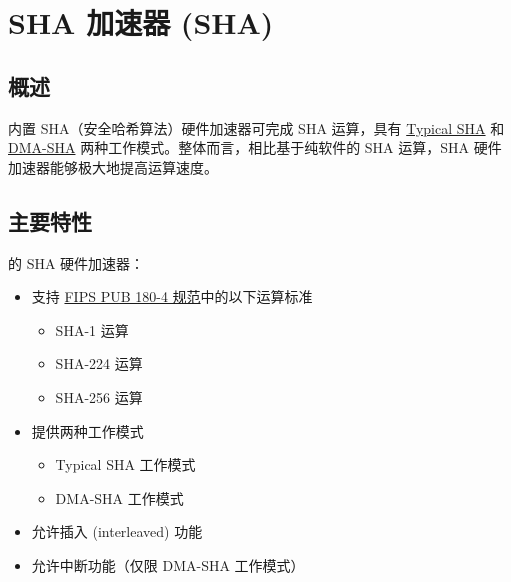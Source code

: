 \documentclass[main\_\_CN.tex]{subfiles}
\begin{document}

\ifglobal
\else
    {\let\clearpage\relax \listoftodos}
    {\let\clearpage\relax \listofdonetodos}
    \tableofcontents
\fi



\hypertarget{sha}{}
\chapter{SHA 加速器 (SHA)} \label{mod:sha}

\section{概述}

\chipname{} 内置 SHA（安全哈希算法）硬件加速器可完成 SHA 运算，具有 \hyperref[sec:sha-typical-sha]{Typical SHA} 和 \hyperref[sec:sha-dma-sha]{DMA-SHA} 两种工作模式。整体而言，相比基于纯软件的 SHA 运算，SHA 硬件加速器能够极大地提高运算速度。

\section{主要特性}

\chipname{} 的 SHA 硬件加速器：

\begin{itemize}
    \item 支持 \href{https://doi.org/10.6028/NIST.FIPS.180-4}{FIPS PUB 180-4 规范}中的以下运算标准
    \begin{itemize}
        \item SHA-1 运算
        \item SHA-224 运算
        \item SHA-256 运算
    \end{itemize}
    \item 提供两种工作模式
    \begin{itemize}
        \item Typical SHA 工作模式 
        \item DMA-SHA 工作模式  
    \end{itemize}
    \item 允许插入 (interleaved) 功能
    \item 允许中断功能（仅限 DMA-SHA 工作模式）
\end{itemize}
\end{document}
